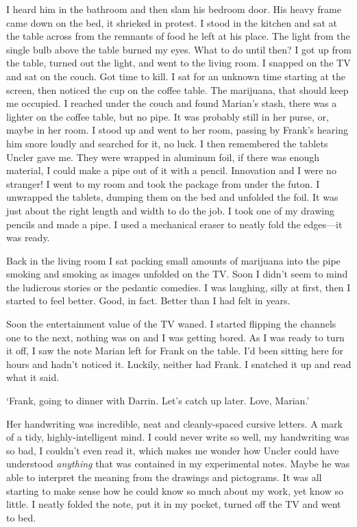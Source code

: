 I heard him in the bathroom and then slam his bedroom door. His heavy
frame came down on the bed, it shrieked in protest. I stood in the
kitchen and sat at the table across from the remnants of food he left at
his place. The light from the single bulb above the table burned my
eyes. What to do until then? I got up from the table, turned out the
light, and went to the living room. I snapped on the TV and sat on the
couch. Got time to kill. I sat for an unknown time starting at the
screen, then noticed the cup on the coffee table. The marijuana, that
should keep me occupied. I reached under the couch and found Marian's
stash, there was a lighter on the coffee table, but no pipe. It was
probably still in her purse, or, maybe in her room. I stood up and went
to her room, passing by Frank's hearing him snore loudly and searched
for it, no luck. I then remembered the tablets Uncler gave me. They were
wrapped in aluminum foil, if there was enough material, I could make a
pipe out of it with a pencil. Innovation and I were no stranger! I went
to my room and took the package from under the futon. I unwrapped the
tablets, dumping them on the bed and unfolded the foil. It was just
about the right length and width to do the job. I took one of my drawing
pencils and made a pipe. I used a mechanical eraser to neatly fold the
edges---it was ready.

Back in the living room I sat packing small amounts of marijuana into
the pipe smoking and smoking as images unfolded on the TV. Soon I didn't
seem to mind the ludicrous stories or the pedantic comedies. I was
laughing, silly at first, then I started to feel better. Good, in fact.
Better than I had felt in years.

Soon the entertainment value of the TV waned. I started flipping the
channels one to the next, nothing was on and I was getting bored. As I
was ready to turn it off, I saw the note Marian left for Frank on the
table. I'd been sitting here for hours and hadn't noticed it. Luckily,
neither had Frank. I snatched it up and read what it said.

`Frank, going to dinner with Darrin. Let's catch up later. Love,
Marian.'

Her handwriting was incredible, neat and cleanly-spaced cursive letters.
A mark of a tidy, highly-intelligent mind. I could never write so well,
my handwriting was so bad, I couldn't even read it, which makes me
wonder how Uncler could have understood \emph{anything} that was
contained in my experimental notes. Maybe he was able to interpret the
meaning from the drawings and pictograms. It was all starting to make
sense how he could know so much about my work, yet know so little. I
neatly folded the note, put it in my pocket, turned off the TV and went
to bed.

